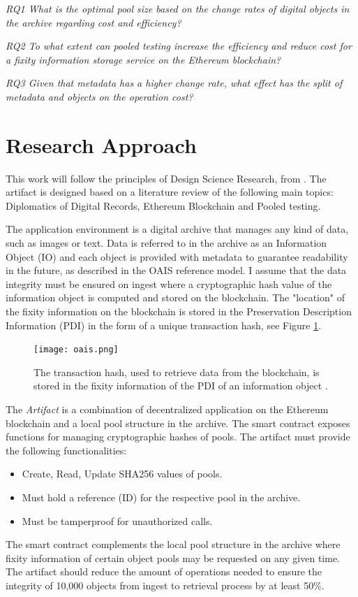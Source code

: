 \documentclass[final]{vutinfth}
\begin{document}
\textit{RQ1 What is the optimal pool size based on the change rates of digital objects in the archive regarding cost and efficiency?}

\textit{RQ2 To what extent can pooled testing increase the efficiency and reduce cost for a fixity information storage service on the Ethereum blockchain?}

\textit{RQ3 Given that metadata has a higher change rate, what effect has the split of metadata and objects on the operation cost?}

\section{Research Approach}
\label{sec:approach}
This work will follow the principles of Design Science Research, from \cite{hevner2007three}. The artifact is designed based on a literature review of the following main topics: Diplomatics of Digital Records, Ethereum Blockchain and Pooled testing.

The application environment is a digital archive that manages any kind of data, such as images or text. Data is referred to in the archive as an Information Object (IO) and each object is provided with metadata to guarantee readability in the future, as described in the OAIS reference model. I assume that the data integrity must be ensured on ingest where a cryptographic hash value of the information object is computed and stored on the blockchain. The "location" of the fixity information on the blockchain is stored in the Preservation Description Information (PDI) in the form of a unique transaction hash, see Figure \ref{fig:oais-fixity}. 

\begin{figure}[t]
  \centering
  \texttt{[image: oais.png]}
  \caption{The transaction hash, used to retrieve data from the blockchain, is stored in the fixity information of the PDI of an information object \cite[7]{lee2010open}.}
  \label{fig:oais-fixity}
\end{figure}

The \textit{Artifact} is a combination of decentralized application on the Ethereum blockchain and a local pool structure in the archive. The smart contract exposes functions for managing cryptographic hashes of pools.
The artifact must provide the following functionalities:
\begin{itemize}
  \item Create, Read, Update SHA256 values of pools.
  \item Must hold a reference (ID) for the respective pool in the archive.
  \item Must be tamperproof for unauthorized calls.
\end{itemize}
The smart contract complements the local pool structure in the archive where fixity information of certain object pools may be requested on any given time. The artifact should reduce the amount of operations needed to ensure the integrity of 10,000 objects from ingest to retrieval process by at least 50\%.
\end{document}
